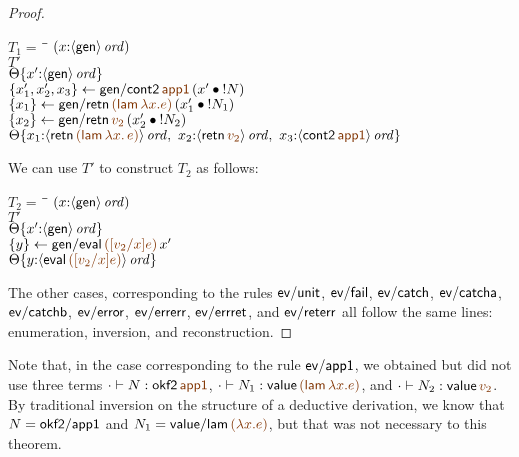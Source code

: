 \begin{proof}
\begin{description}
\begin{tabbing}
$T_1 = ~$ \= \qquad \= $(x{:}{\langle {\sf gen} \rangle}\,{{\it ord}})$
\\
\>$T'$
\\
\>\>${\Theta}\{{x'{:}{\langle {\sf gen} \rangle}\,{{\it ord}}}\}$
\\
\>$\trstep{x_1', x_2', x_3}
     {{\sf gen/cont2}\,\lf{\sf app1}\,(\tfuser{x'}{\tbangr{N}})}$
\\
\>$\trstep{x_1}
     {{\sf gen/retn}\,\lf{({\sf lam}\,\lambda x.e)}\,
        (\tfuser{x_1'}{\tbangr{N_1}})}$ 
\\
\>$\trstep{x_2}
     {{\sf gen/retn}\,\lf{v_2}\,(\tfuser{x_2'}{\tbangr{N_2}})}$
\\
\>\>$\tackon{\Theta}{x_1{:}\istrue{\susp{{\sf retn}\,\lf{({\sf lam}\,\lambda x.\,e)}}}, ~
                   x_2{:}\istrue{\susp{{\sf retn}\,\lf{v_2}}}, ~
                   x_3{:}\istrue{\susp{{\sf cont2}\,\lf{\sf app1}}}}$
\end{tabbing}

We can use $T'$ to construct $T_2$ as follows:
\begin{tabbing}
$T_2 = ~$ \= \qquad \= $(x{:}{\langle {\sf gen} \rangle}\,{{\it ord}})$
\\
\>$T'$
\\
\>\>${\Theta}\{{x'{:}{\langle {\sf gen} \rangle}\,{{\it ord}}}\}$
\\
\>$\trstep{y}
     {{\sf gen/eval}\,\lf{([v_2/x]e)}\,x'}$
\\
\>\>$\tackon{\Theta}{y{:}\istrue{\susp{{\sf eval}\,\lf{([v_2/x]e)}}}}$
\end{tabbing}


\end{description}

\noindent
The other cases, corresponding to the rules ${\sf ev/unit}$, ${\sf
  ev/fail}$, ${\sf ev/catch}$, ${\sf ev/catcha}$, ${\sf ev/catchb}$,
${\sf ev/error}$, ${\sf ev/errerr}$, ${\sf ev/errret}$, and ${\sf
  ev/reterr}$ all follow the same lines: enumeration, inversion, and
reconstruction. 
\end{proof}

Note that, in the case corresponding to the rule ${\sf ev/app1}$, we
obtained but did not use three terms $\cdot \vdash N : {{\sf
    okf2}\,\lf{\sf app1}}$, $\cdot \vdash N_1 : {\sf value}\,\lf{({\sf
    lam}\,\lambda x.e)}$, and $\cdot \vdash N_2 : {{\sf
    value}\,\lf{v_2}}$. By traditional inversion on the structure of a
deductive derivation, we know that $N = {\sf okf2/app1}$ and $N_1 =
{\sf value/lam}\,\lf{(\lambda x.e)}$, but that was not necessary to
this theorem.


